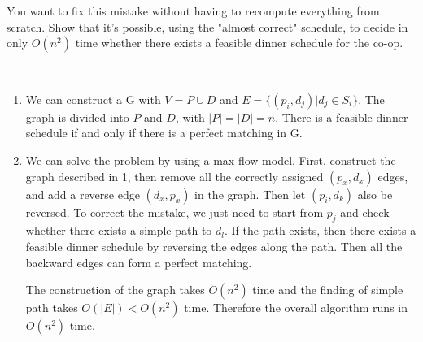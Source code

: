 \begin{exercise}[]
{\begin{enumerate}
        You want to fix this mistake without having to recompute everything from scratch. Show that it's possible, using the "almost correct" schedule, to decide in only $O(n^2)$ time whether there exists a feasible dinner schedule for the co-op.
    \end{enumerate}   }
  \begin{solution}
  \par{~}
  \begin{enumerate}
    \item We can construct a G with $V=P\cup D$ and $E = \{(p_i,d_j)|d_j \in S_i\}$. The graph is divided into $P$ and $D$, with $|P|=|D|=n$. There is a feasible dinner schedule if and only if there is a perfect matching in G.
    \item We can solve the problem by using a max-flow model. First, construct the graph described in 1, then remove all the correctly assigned $(p_x,d_x)$ edges, and add a reverse edge $(d_x,p_x)$ in the graph. Then let $(p_i,d_k)$ also be reversed. To correct the mistake, we just need to start from $p_j$ and check whether there exists a simple path to $d_l$. If the path exists, then there exists a feasible dinner schedule by reversing the edges along the path. Then all the backward edges can form a perfect matching.
    
    The construction of the graph takes $O(n^2)$ time and the finding of simple path takes $O(|E|)<O(n^2)$ time. Therefore the overall algorithm runs in $O(n^2)$ time.
  \end{enumerate}
  
  \end{solution}
  \label{ex3}
\end{exercise}

